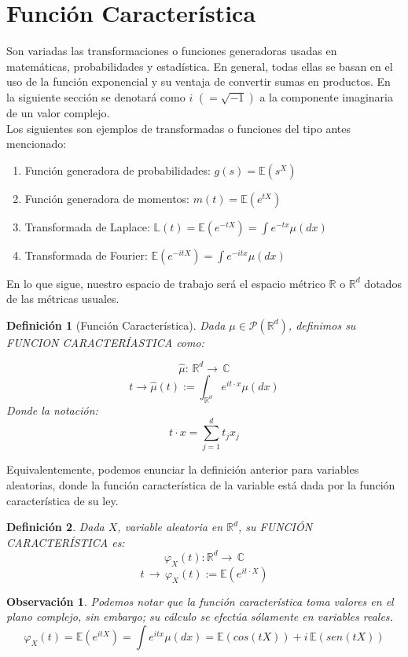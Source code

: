 \documentclass[a4paper]{article}
\newtheorem{definicion}{Definición}
\numberwithin{equation}{subsection}
\newtheorem{obs}{Observación}
\def\C{\mathbb C}
\def\R{\mathbb R}
\def\E{\mathbb E}
\begin{document}
\section{Función Característica}
Son variadas las transformaciones o funciones generadoras usadas en matemáticas, probabilidades y estadística. En general, todas ellas se basan en el uso de la función exponencial y su ventaja de convertir sumas en productos. En la siguiente sección se denotará como $i$ $(=\sqrt{-1})$ a la componente imaginaria de un valor complejo.\\
Los siguientes son ejemplos de transformadas o funciones del tipo antes mencionado:
\begin{enumerate}
    \item Función generadora de probabilidades: $g(s)=\E(s^{X})$
    \item Función generadora de momentos: $m(t) = \E(e^{tX})$
    \item Transformada de Laplace: $\mathbb{L}(t) = \E(e^{-tX}) = \int e^{-tx}\mu(dx)$
    \item Transformada de Fourier: $\E(e^{-itX}) = \int e^{-itx}\mu(dx)$
\end{enumerate}

En lo que sigue, nuestro espacio de trabajo será el espacio métrico $\R$ o $\R^{d}$ dotados de las métricas usuales.

\begin{definicion}[Función Característica] Dada $\mu \in \mathcal{P}(\R^{d})$, definimos su FUNCION CARACTERÍASTICA como:

    \[\hat{\mu}:\,\R^{d} \longrightarrow\,\C\]
    \begin{equation}
    t \longrightarrow \hat{\mu}(t) := \int_{\R^d} e^{it\cdot x}\mu(dx)
\end{equation}
Donde la notación:
\[t\cdot x = \sum_{j=1}^{d}t_j x_j\]
\end{definicion}

Equivalentemente, podemos enunciar la definición anterior para variables aleatorias, donde la función característica de la variable está dada por la función característica de su ley.

\begin{definicion} Dada $X$, variable aleatoria en $\R^d$, su FUNCIÓN CARACTERÍSTICA es:
\[\varphi_X(t):\R^d \longrightarrow\,\C\]
\begin{equation}
    t \,\longrightarrow\,\varphi_X(t) := \E(e^{it \cdot X})
\end{equation}
\end{definicion}
\begin{obs} Podemos notar que la función característica toma valores en el plano complejo, sin embargo; su cálculo se efectúa sólamente en variables reales.
\[\varphi_X(t) = \E(e^{itX}) = \int e^{itx}\mu(dx) = \E(cos(tX)) + i\,\E(sen(tX))\]
\end{obs}
\end{document}
